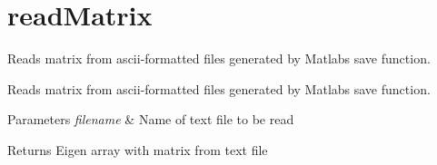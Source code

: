 \hypertarget{group__readMatrix}{}\section{read\+Matrix}
\label{group__readMatrix}


Reads matrix from ascii-\/formatted files generated by Matlab\textquotesingle{}s \textquotesingle{}save\textquotesingle{} function.  


Reads matrix from ascii-\/formatted files generated by Matlab\textquotesingle{}s \textquotesingle{}save\textquotesingle{} function. 


\begin{DoxyParams}{Parameters}
{\em filename} & Name of text file to be read \\
\hline
\end{DoxyParams}
\begin{DoxyReturn}{Returns}
Eigen array with matrix from text file 
\end{DoxyReturn}
